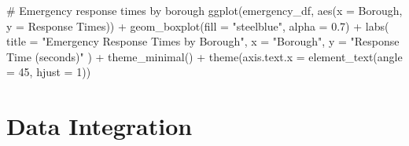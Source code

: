 \documentclass[
  letterpaper,
  DIV=11,
  numbers=noendperiod]{scrreprt}
\newenvironment{Shaded}{\begin{snugshade}}{\end{snugshade}}
\newcommand{\AttributeTok}[1]{\textcolor[rgb]{0.40,0.45,0.13}{#1}}
\newcommand{\CommentTok}[1]{\textcolor[rgb]{0.37,0.37,0.37}{#1}}
\newcommand{\DecValTok}[1]{\textcolor[rgb]{0.68,0.00,0.00}{#1}}
\newcommand{\FloatTok}[1]{\textcolor[rgb]{0.68,0.00,0.00}{#1}}
\newcommand{\FunctionTok}[1]{\textcolor[rgb]{0.28,0.35,0.67}{#1}}
\newcommand{\NormalTok}[1]{\textcolor[rgb]{0.00,0.23,0.31}{#1}}
\newcommand{\SpecialCharTok}[1]{\textcolor[rgb]{0.37,0.37,0.37}{#1}}
\newcommand{\StringTok}[1]{\textcolor[rgb]{0.13,0.47,0.30}{#1}}
\begin{document}
\begin{Shaded}
\begin{Highlighting}[]
\CommentTok{\# Emergency response times by borough}
\FunctionTok{ggplot}\NormalTok{(emergency\_df, }\FunctionTok{aes}\NormalTok{(}\AttributeTok{x =}\NormalTok{ Borough, }\AttributeTok{y =} \StringTok{\textasciigrave{}}\AttributeTok{Response Times}\StringTok{\textasciigrave{}}\NormalTok{)) }\SpecialCharTok{+}
  \FunctionTok{geom\_boxplot}\NormalTok{(}\AttributeTok{fill =} \StringTok{"steelblue"}\NormalTok{, }\AttributeTok{alpha =} \FloatTok{0.7}\NormalTok{) }\SpecialCharTok{+}
  \FunctionTok{labs}\NormalTok{(}
    \AttributeTok{title =} \StringTok{"Emergency Response Times by Borough"}\NormalTok{,}
    \AttributeTok{x =} \StringTok{"Borough"}\NormalTok{,}
    \AttributeTok{y =} \StringTok{"Response Time (seconds)"}
\NormalTok{  ) }\SpecialCharTok{+}
  \FunctionTok{theme\_minimal}\NormalTok{() }\SpecialCharTok{+}
  \FunctionTok{theme}\NormalTok{(}\AttributeTok{axis.text.x =} \FunctionTok{element\_text}\NormalTok{(}\AttributeTok{angle =} \DecValTok{45}\NormalTok{, }\AttributeTok{hjust =} \DecValTok{1}\NormalTok{))}
\end{Highlighting}
\end{Shaded}

\section{Data Integration}\label{data-integration}
\end{document}
